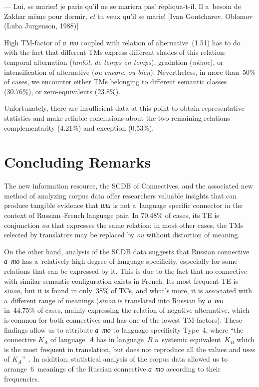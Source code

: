 \begin{multicols}{2}
\begin{enumerate}[(1)]
 
--- Lui, se marier! je parie qu'il ne se mariera pas!  
r$\acute{\mbox{e}}$pliqua-t-il. Il a~besoin de Zakhar m$\hat{\mbox{e}}$me 
pour dormir, \textit{et} tu veux qu'il se marie! [Ivan Gontcharov. Oblomov (Luba 
Jurgenson, 1988)]
\end{enumerate}

  High TM-factor of \textit{а~то} coupled with relation of alternative~(1.51) has to 
do with the fact that different TMs express different shades of this 
relation: temporal alternation (\textit{tant$\hat{\mbox{o}}$t}, \textit{de temps en 
temps}), gradation (\textit{m$\hat{\mbox{e}}$me}), or intensification of alternative 
(\textit{ou encore}, \textit{ou bien}). Nevertheless, in more than~50\% of cases, we 
encounter either TMs belonging to different semantic classes 
(30.76\%), or zero-equivalents (23.8\%).
  
  Unfortunately, there are insufficient data at this point to obtain representative 
statistics and make reliable conclusions about the two remaining relations~--- 
complementarity (4.21\%) and exception (0.53\%).

\vspace*{-6pt}
  
  \section{Concluding Remarks}
  
  \noindent
  The new information resource, the SCDB of Connectives, and the associated new 
method of analyzing corpus data offer researchers valuable insights that can produce 
tangible evidence that \textit{или} is not a~language specific connector in the context 
of Russian--French language pair. In 70.48\% of cases, its TE is 
conjunction \textit{ou} that expresses the same relation; in most other cases,
 the TMs selected by translators may be replaced by \textit{ou} without distortion of 
meaning. 
  
  On the other hand, analysis of the SCDB data suggests that Russian connective 
\textit{а~то} has a~relatively high degree of language specificity, especially for some 
relations that can be expressed by it. This is due to the fact that no connective with 
similar semantic configuration exists in French. Its most frequent TE
is \textit{sinon}, but it is found in only~38\% of TCs, and what's more, it 
is associated with a~different range of meanings (\textit{sinon} is translated into 
Russian by \textit{а~то} in~44.75\% of cases, mainly expressing the relation of 
negative alternative, which is common for both connectives and has one of the lowest 
TM-factors). These findings allow us to attribute \textit{а~то} to language 
specificity Type~4, where ``the connective $K_A$ of language~$A$ has in 
language~$B$ a~systemic equivalent~$K_B$ which is the most frequent in 
translation, but does not reproduce all the values and uses of $K_A$''~\cite{9-in}. In 
addition, statistical analysis of the corpus data allowed us to arrange~6~meanings 
of the Russian connective \textit{а~то} according to their frequencies.
{

}
\end{multicols}
